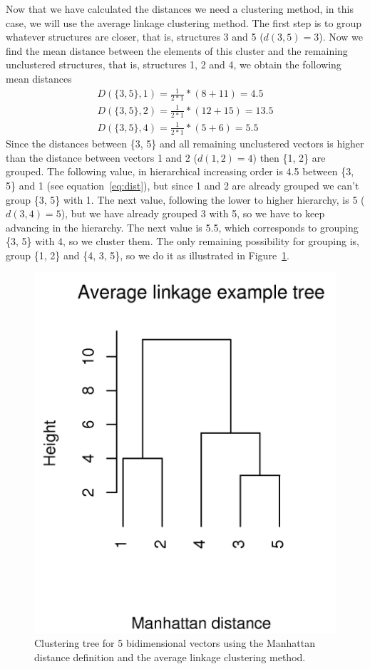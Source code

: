 Now that we have calculated the distances we need a clustering method, in this
case, we will use the average linkage clustering method. The first step is to
group whatever structures are closer, that is, structures 3 and 5
($d(3, 5)=3$). Now we find the mean distance between the elements of
this cluster and the remaining unclustered structures, that is,
structures 1, 2 and 4, we obtain the following mean distances
\begin{gather}
D(\{3,5\}, 1)=\frac{1}{2*1}*(8+11) = 4.5 \label{eq:dist}\\
D(\{3,5\}, 2)=\frac{1}{2*1}*(12+15) = 13.5\\
D(\{3,5\}, 4)=\frac{1}{2*1}*(5+6) = 5.5
\end{gather}
Since the distances between \{3, 5\} and all remaining unclustered
vectors is higher than the distance between vectors 1 and 2
($d(1, 2)=4$) then \{1, 2\} are grouped. The following value, in
hierarchical increasing order is 4.5 between \{3, 5\} and 1 (see
equation~\ref{eq:dist}), but since 1 and 2 are already
grouped we can't group \{3, 5\} with 1. The next value,
following the lower to higher hierarchy, is 5 ($d(3, 4)=5$), but we have
already grouped 3 with 5, so we have to keep advancing in the
hierarchy. The next value is 5.5, which corresponds to grouping \{3,
5\} with 4, so we cluster them. The only remaining possibility for
grouping is, group \{1, 2\} and \{4, 3, 5\}, so we do it as
illustrated in Figure~\ref{fig:tree}.
\begin{figure}[t]
\centering
\includegraphics[scale=0.4]{Appendix/appendixtree.png}
\caption{Clustering tree for 5 bidimensional vectors using the Manhattan
distance definition and the average linkage clustering method.}
\label{fig:tree}
\end{figure}


